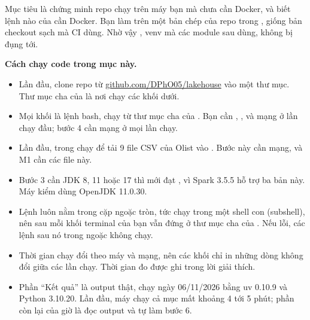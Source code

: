 Mục tiêu là chứng minh repo chạy trên máy bạn mà chưa cần Docker, và biết lệnh nào của  cần Docker. Bạn làm trên một bản chép của repo trong , giống bản checkout sạch mà CI dùng. Nhờ vậy , venv mà các module sau dùng, không bị đụng tới.

\begin{ghichu}
\textbf{Cách chạy code trong mục này.}
\begin{itemize}
  \item Lần đầu, clone repo  từ \href{https://github.com/DPhO05/lakehouse}{github.com/DPhO05/lakehouse} vào một thư mục. Thư mục cha của  là nơi chạy các khối dưới.
  \item Mọi khối là lệnh bash, chạy từ thư mục cha của . Bạn cần , ,  và mạng ở lần chạy đầu; bước 4 cần mạng ở mọi lần chạy.
  \item Lần đầu, trong  chạy  để tải 9 file CSV của Olist vào . Bước này cần mạng, và M1 cần các file này.
  \item Bước 3 cần JDK 8, 11 hoặc 17 thì mới đạt , vì Spark 3.5.5 hỗ trợ ba bản này. Máy kiểm dùng OpenJDK 11.0.30.
  \item Lệnh  luôn nằm trong cặp ngoặc tròn, tức chạy trong một shell con (subshell), nên sau mỗi khối terminal của bạn vẫn đứng ở thư mục cha của . Nếu  lỗi, các lệnh sau nó trong ngoặc không chạy.
  \item Thời gian chạy đổi theo máy và mạng, nên các khối chỉ in những dòng không đổi giữa các lần chạy. Thời gian đo được ghi trong lời giải thích.
  \item Phần ``Kết quả'' là output thật, chạy ngày 06/11/2026 bằng uv 0.10.9 và Python 3.10.20. Lần đầu, máy chạy cả mục mất khoảng 4 tới 5 phút; phần còn lại của giờ là đọc output và tự làm bước 6.
\end{itemize}
\end{ghichu}

